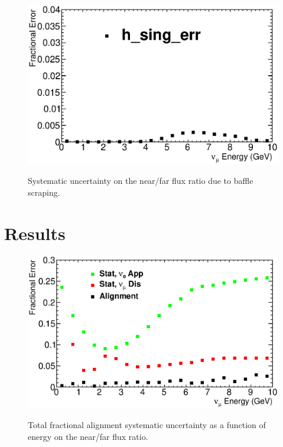 \begin{figure}[ht]
\label{fig:baffle_error}
  \begin{center}
    {\includegraphics[width=6.0in]{figures/BeamOffsetX7Sigma0pnt001_nof_error.eps}}
  \end{center}
\caption{ Systematic uncertainty on the near/far flux ratio due to baffle scraping. }
\end{figure}


\section{Results}
\label{sec:results}

\begin{figure}[ht]
  \begin{center}
    {\includegraphics[width=6.0in]{figures/tot_error_nof.eps}}
  \end{center}
\caption{ Total fractional alignment systematic uncertainty as a function of energy on the near/far flux ratio. }
\end{figure}

